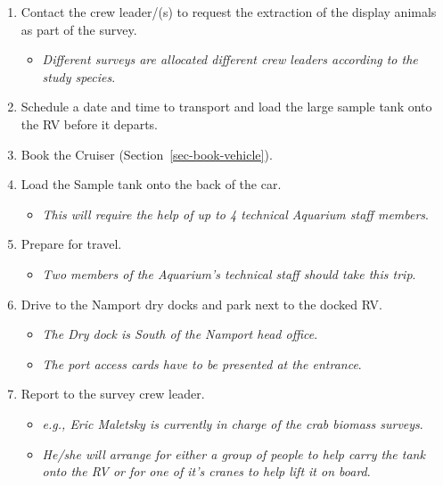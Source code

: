 \documentclass[
  letterpaper,
  DIV=11,
  numbers=noendperiod]{scrreprt}
\providecommand{\tightlist}{%
  \setlength{\itemsep}{0pt}\setlength{\parskip}{0pt}}\usepackage{longtable,booktabs,array}
\begin{document}
\begin{enumerate}
\def\labelenumi{\arabic{enumi}.}
\tightlist
\item
  Contact the crew leader/(s) to request the extraction of the display
  animals as part of the survey.

  \begin{itemize}
  \tightlist
  \item
    \emph{Different surveys are allocated different crew leaders
    according to the study species}.
  \end{itemize}
\item
  Schedule a date and time to transport and load the large sample tank
  onto the RV before it departs.
\item
  Book the Cruiser (Section~\ref{sec-book-vehicle}).
\item
  Load the Sample tank onto the back of the car.

  \begin{itemize}
  \tightlist
  \item
    \emph{This will require the help of up to 4 technical Aquarium staff
    members}.
  \end{itemize}
\item
  Prepare for travel.

  \begin{itemize}
  \tightlist
  \item
    \emph{Two members of the Aquarium's technical staff should take this
    trip}.
  \end{itemize}
\item
  Drive to the Namport dry docks and park next to the docked RV.

  \begin{itemize}
  \tightlist
  \item
    \emph{The Dry dock is South of the Namport head office}.
  \item
    \emph{The port access cards have to be presented at the entrance}.
  \end{itemize}
\item
  Report to the survey crew leader.

  \begin{itemize}
  \tightlist
  \item
    \emph{e.g., Eric Maletsky is currently in charge of the crab biomass
    surveys}.
  \item
    \emph{He/she will arrange for either a group of people to help carry
    the tank onto the RV or for one of it's cranes to help lift it on
    board}.
  \end{itemize}
\end{enumerate}
\end{document}
